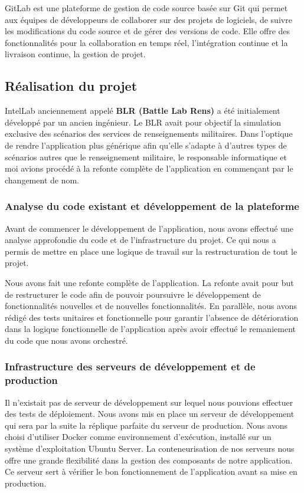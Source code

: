 GitLab est une plateforme de gestion de code source basée sur Git qui permet aux équipes de développeurs de collaborer sur des projets de logiciels, de suivre les modifications du code source et de gérer des versions de code.
Elle offre des fonctionnalités pour la collaboration en temps réel, l'intégration continue et la livraison continue, la gestion de projet.


\subsection{Réalisation du projet}
IntelLab anciennement appelé \textbf{BLR (Battle Lab Rens)} a été initialement développé par un ancien ingénieur. Le BLR avait pour objectif la simulation exclusive des scénarios des services de renseignements militaires.
Dans l’optique de rendre l’application plus générique afin qu’elle s’adapte à d’autres types de scénarios autres que le renseignement militaire, le responsable informatique et moi avions procédé à la refonte complète de l’application en commençant par le changement de nom.


\subsubsection{Analyse du code existant et développement de la plateforme}

Avant de commencer le développement de l’application, nous avons effectué une analyse approfondie du code et de l’infrastructure du projet.
Ce qui nous a permis de mettre en place une logique de travail sur la restructuration de tout le projet.

Nous avons fait une refonte complète de l’application. La refonte avait pour but de restructurer le code afin de pouvoir poursuivre le développement de fonctionnalités nouvelles et de nouvelles fonctionnalités.
En parallèle, nous avons rédigé des tests unitaires et fonctionnelle pour garantir l'absence de détérioration dans la logique fonctionnelle de l'application après avoir effectué le remaniement du code que nous avons orchestré.


\subsubsection{Infrastructure des serveurs de développement et de production}

Il n'existait pas de serveur de développement sur lequel nous pouvions effectuer des tests de déploiement. Nous avons mis en place un serveur de développement qui sera par la suite la réplique parfaite du serveur de production.
Nous avons choisi d'utiliser Docker comme environnement d'exécution, installé sur un système d'exploitation Ubuntu Server.
La conteneurisation de nos serveurs nous offre une grande flexibilité dans la gestion des composants de notre application.
Ce serveur sert à vérifier le bon fonctionnement de l'application avant sa mise en production.

